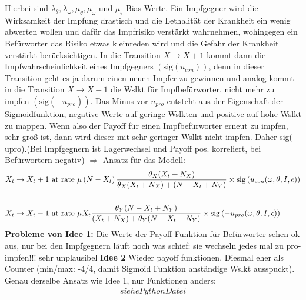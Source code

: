 \documentclass[10pt,a4paper]{article}
\begin{document}
Hierbei sind $\lambda_{\theta}, \lambda_{\omega}, \mu_{\theta}, \mu_{\omega}$ und $\mu_{\epsilon}$ Bias-Werte. Ein Impfgegner wird die Wirksamkeit der Impfung drastisch und die Lethalität der Krankheit ein wenig abwerten wollen und dafür das Impfrisiko verstärkt wahrnehmen, wohingegen ein Befürworter das Risiko etwas kleinreden wird und die Gefahr der Krankheit verstärkt berücksichtigen.\newline
In die Transition $X \rightarrow X + 1$ kommt dann die Impfwahrscheinlichkeit eines Impfgegners $(\mathrm{sig}\left( u_{con}\right))$, denn in dieser Transition geht es ja darum einen neuen Impfer zu gewinnen und analog kommt in die Transition $X \rightarrow X-1$ die Wslkt für Impfbefürworter, nicht mehr zu impfen $(\mathrm{sig}\left( -u_{pro}\right))$.\newline
Das Minus vor $u_{pro}$ entsteht aus der Eigenschaft der Sigmoidfunktion, negative Werte auf geringe Wslkten und positive auf hohe Wslkt zu mappen. Wenn also der Payoff für einen Impfbefürworter erneut zu impfen, sehr groß ist, dann wird dieser mit sehr geringer Wslkt nicht impfen. Daher sig(-upro).(Bei Impfgegnern ist Lagerwechsel und Payoff pos. korreliert, bei Befürwortern negativ)\newline
$\Rightarrow$ Ansatz für das Modell:
\begin{align*}
\begin{split}
X_t \rightarrow X_t + 1 & \textnormal{ at rate } \mu\left(N-X_t\right)\frac{\theta_X (X_t + N_X)}{\theta_X (X_t + N_X) + (N - X_t + N_Y)} \times \mathrm{sig}\left(u_{con}(\omega, \theta, I, \epsilon)\right) \\
&\\
X_t \rightarrow X_t - 1 & \textnormal{ at rate } \mu X_t\frac{\theta_Y(N-X_t+N_Y)}{(X_t + N_X) + \theta_Y(N-X_t+N_Y)} \times \mathrm{sig}\left(- u_{pro}(\omega, \theta, I, \epsilon)\right)
\end{split}
\end{align*}
\textbf{Probleme von Idee 1:}\newline
Die Werte der Payoff-Funktion für Befürworter sehen ok aus, nur bei den Impfgegnern läuft noch was schief: sie wechseln jedes mal zu pro-impfen!!! sehr unplausibel
\newpage
\textbf{Idee 2}\newline
Wieder payoff funktionen. Diesmal eher als Counter (min/max: -4/4, damit Sigmoid Funktion anständige Wslkt ausspuckt). Genau derselbe Ansatz wie Idee 1, nur Funktionen anders:
\begin{align*}
	siehe Python Datei
\end{align*}
\end{document}

